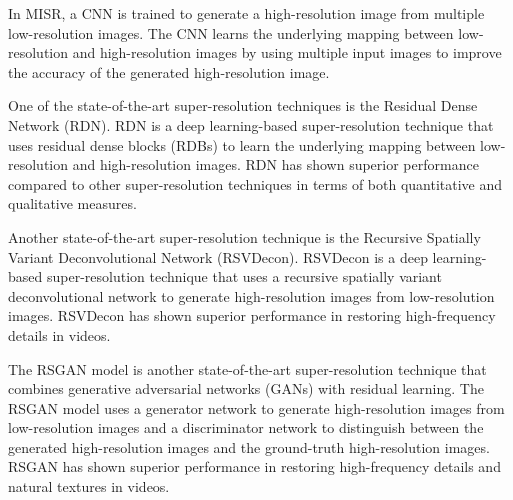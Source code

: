 In MISR, a CNN is trained to generate a high-resolution image from multiple low-resolution images. The CNN learns the underlying mapping between low-resolution and high-resolution images by using multiple input images to improve the accuracy of the generated high-resolution image.

One of the state-of-the-art super-resolution techniques is the Residual Dense Network (RDN). RDN is a deep learning-based super-resolution technique that uses residual dense blocks (RDBs) to learn the underlying mapping between low-resolution and high-resolution images. RDN has shown superior performance compared to other super-resolution techniques in terms of both quantitative and qualitative measures.

Another state-of-the-art super-resolution technique is the Recursive Spatially Variant Deconvolutional Network (RSVDecon). RSVDecon is a deep learning-based super-resolution technique that uses a recursive spatially variant deconvolutional network to generate high-resolution images from low-resolution images. RSVDecon has shown superior performance in restoring high-frequency details in videos.

The RSGAN model is another state-of-the-art super-resolution technique that combines generative adversarial networks (GANs) with residual learning. The RSGAN model uses a generator network to generate high-resolution images from low-resolution images and a discriminator network to distinguish between the generated high-resolution images and the ground-truth high-resolution images. RSGAN has shown superior performance in restoring high-frequency details and natural textures in videos.


